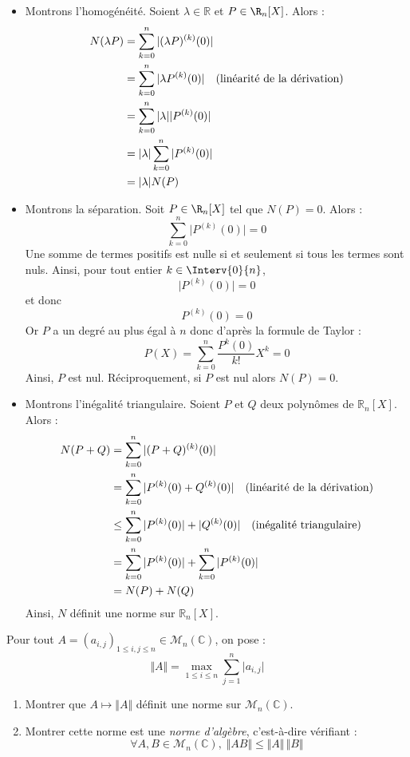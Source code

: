\documentclass[a4paper,10pt]{report}
\begin{document}
\begin{itemize}
\item Montrons l'homogénéité. Soient $\lambda \in \mathbb{R}$ et $P \in  \R_n[X ]$. Alors :
\begin{align*}
N(\lambda P) & =  \sum_{k = 0}^{ n } \vert (\lambda P)^{(k)} (0) \vert  \\
& =  \sum_{k = 0}^{ n }  \vert \lambda P^{(k)} (0) \vert \quad \hbox{(linéarité de la dérivation)} \\
& =  \sum_{k = 0}^{ n } \vert \lambda \vert \vert P^{(k)} (0) \vert \\
& = \vert \lambda \vert \sum_{k = 0}^{ n } \vert P^{(k)} (0) \vert \\
& = \vert \lambda \vert N(P) 
\end{align*}
\item Montrons la séparation. Soit $P \in  \R_n[X ]$ tel que $N(P)=0$. Alors :  
$$ \sum_{k = 0}^{ n } \vert P^{(k)} (0) \vert =0$$
Une somme de termes positifs est nulle si et seulement si tous les termes sont nuls. Ainsi, pour tout entier $k \in \Interv{0}{n}$,
$$  \vert P^{(k)} (0) \vert = 0$$
et donc 
$$   P^{(k)} (0)  = 0$$
Or $P$ a un degré au plus égal à $n$ donc d'après la formule de Taylor :
$$ P(X) = \sum_{k=0}^n \dfrac{P^{k}(0)}{k!} X^k = 0$$
Ainsi, $P$ est nul. Réciproquement, si $P$ est nul alors $N(P)=0$.
\item Montrons l'inégalité triangulaire. Soient $P$ et $Q$ deux polynômes de $\mathbb{R}_n[X]$. Alors :
\begin{align*}
N(P+Q) & = \sum_{k = 0}^{ n } \vert (P+Q)^{(k)} (0) \vert \\
& = \sum_{k = 0}^{ n } \vert P^{(k)} (0) +  Q^{(k)} (0) \vert \quad \hbox{(linéarité de la dérivation)} \\
& \leq \sum_{k = 0}^{ n } \vert P^{(k)} (0) \vert +  \vert Q^{(k)} (0) \vert \quad \hbox{(inégalité triangulaire)} \\
& = \sum_{k = 0}^{ n } \vert P^{(k)} (0) \vert + \sum_{k = 0}^{ n } \vert P^{(k)} (0) \vert \\
& = N(P) + N(Q)
\end{align*}
Ainsi, $N$ définit une norme sur $\mathbb{R}_n[X]$.
\end{itemize}


\begin{Exa} Pour tout $A = (a_{i,j})_{1 \leq i,j \leq n} \in \mathcal{M}_{n}(\mathbb{C})$, on pose :
  \[
  \Vert A \Vert = \max_{1 \leq i \leq n} \sum_{j = 1}^{n}  \vert a_{i,j} \vert
  \]
  \begin{enumerate}
  \item Montrer que $A \mapsto \Vert A \Vert$ définit une norme sur $\mathcal{M}_{n}(\mathbb{C})$.
  \item Montrer cette norme est une \textit{norme d'algèbre}, c'est-à-dire vérifiant :
    \[
    \forall A,B \in \mathcal{M}_{n}(\mathbb{C}),  \; \Vert AB \Vert \leq \Vert A \Vert \, \Vert B \Vert
    \]
  \end{enumerate}
\end{Exa}
\end{document}

